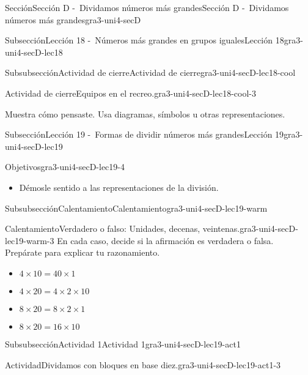 \documentclass[twoside,10pt,]{article}
\begin{document}
\begin{sectionptx}{Sección}{Sección D -~Dividamos números más grandes}{}{Sección D -~Dividamos números más grandes}{}{}{gra3-uni4-secD}
\begin{subsectionptx}{Subsección}{Lección 18 -~Números más grandes en grupos iguales}{}{Lección 18}{}{}{gra3-uni4-secD-lec18}
\begin{subsubsectionptx}{Subsubsección}{Actividad de cierre}{}{Actividad de cierre}{}{}{gra3-uni4-secD-lec18-cool}
\begin{project}{Actividad de cierre}{Equipos en el recreo.}{gra3-uni4-secD-lec18-cool-3}
\par
Muestra cómo pensaste. Usa diagramas, símbolos u otras representaciones.%
\end{project}%
\end{subsubsectionptx}
\end{subsectionptx}
%
%
\typeout{************************************************}
\typeout{************************************************}
%
\begin{subsectionptx}{Subsección}{Lección 19 -~Formas de dividir números más grandes}{}{Lección 19}{}{}{gra3-uni4-secD-lec19}
\begin{objectives}{Objetivos}{gra3-uni4-secD-lec19-4}
%
\begin{itemize}[label=\textbullet]
\item{}Démosle sentido a las representaciones de la división.%
\end{itemize}
\end{objectives}
%
%
\typeout{************************************************}
\typeout{************************************************}
%
\begin{subsubsectionptx}{Subsubsección}{Calentamiento}{}{Calentamiento}{}{}{gra3-uni4-secD-lec19-warm}
\begin{exploration}{Calentamiento}{Verdadero o falso: Unidades, decenas, veintenas.}{gra3-uni4-secD-lec19-warm-3}%
En cada caso, decide si la afirmación es verdadera o falsa. Prepárate para explicar tu razonamiento.%
%
\begin{itemize}[label=\textbullet]
\item{}\(\displaystyle 4 \times 10 = 40 \times 1\)%
\item{}\(\displaystyle 4 \times 20 = 4 \times 2 \times 10\)%
\item{}\(\displaystyle 8 \times 20 = 8 \times 2 \times 1\)%
\item{}\(\displaystyle 8 \times 20 = 16 \times 10\)%
\end{itemize}
\end{exploration}%
\end{subsubsectionptx}
%
%
\typeout{************************************************}
\typeout{************************************************}
%
\begin{subsubsectionptx}{Subsubsección}{Actividad 1}{}{Actividad 1}{}{}{gra3-uni4-secD-lec19-act1}
\begin{activity}{Actividad}{Dividamos con bloques en base diez.}{gra3-uni4-secD-lec19-act1-3}%

\end{activity}
\end{subsubsectionptx}
\end{subsectionptx}
\end{sectionptx}
\end{document}
